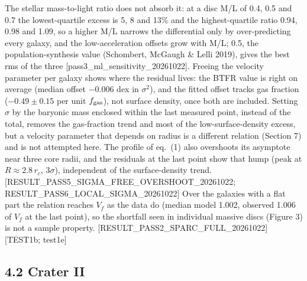 \documentclass[
  10pt,
]{article}
\begin{document}
The stellar mass-to-light ratio does not absorb it: at a disc M/L of 0.4, 0.5 and 0.7 the lowest-quartile excess is 5, 8 and 13\% and the highest-quartile ratio 0.94, 0.98 and 1.09, so a higher M/L narrows the differential only by over-predicting every galaxy, and the low-acceleration offsets grow with M/L; 0.5, the population-synthesis value (Schombert, McGaugh \& Lelli 2019), gives the best rms of the three {[}pass3\_ml\_sensitivity\_20261022{]}. Freeing the velocity parameter per galaxy shows where the residual lives: the BTFR value is right on average (median offset $-0.006$ dex in $\sigma^2$), and the fitted offset tracks gas fraction ($-0.49\pm0.15$ per unit $f_{\rm gas}$), not surface density, once both are included. Setting $\sigma$ by the baryonic mass enclosed within the last measured point, instead of the total, removes the gas-fraction trend and most of the low-surface-density excess, but a velocity parameter that depends on radius is a different relation (Section 7) and is not attempted here. The profile of eq.~(1) also overshoots its asymptote near three core radii, and the residuals at the last point show that hump (peak at $R\approx2.8\,r_c$, $3\sigma$), independent of the surface-density trend. {[}RESULT\_PASS5\_SIGMA\_FREE\_OVERSHOOT\_20261022; RESULT\_PASS6\_LOCAL\_SIGMA\_20261022{]} Over the galaxies with a flat part the relation reaches $V_f$ as the data do (median model 1.002, observed 1.006 of $V_f$ at the last point), so the shortfall seen in individual massive discs (Figure 3) is not a sample property. {[}RESULT\_PASS2\_SPARC\_FULL\_20261022{]} {[}TEST1b; test1e{]}


\subsection{4.2 Crater II}
\end{document}
